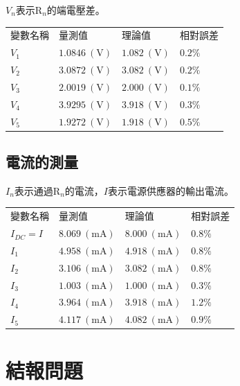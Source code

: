 \documentclass[12pt, a4paper]{article}
\newcommand{\unit}[1]{\:(\text{#1})}
\begin{document}
$V_n$表示$\text{R}_n$的端電壓差。

\begin{center}
	\begin{tabular}{p{2.5cm}p{4cm}p{4cm}p{3cm}}
	\hline
	變數名稱 & 量測值 & 理論值 & 相對誤差 \\
	\hhline{====}
	$V_{1}$ & $1.0846 \unit{V}$ & $1.082 \unit{V}$ & $0.2\%$ \\
	\hline
	$V_{2}$ & $3.0872 \unit{V}$ & $3.082 \unit{V}$ & $0.2\%$ \\
	\hline
	$V_{3}$ & $2.0019 \unit{V}$ & $2.000 \unit{V}$ & $0.1\%$ \\
	\hline
	$V_{4}$ & $3.9295 \unit{V}$ & $3.918 \unit{V}$ & $0.3\%$ \\
	\hline
	$V_{5}$ & $1.9272 \unit{V}$ & $1.918 \unit{V}$ & $0.5\%$ \\
	\hline
\end{tabular}
\end{center}

\subsection{電流的測量}

$I_n$表示通過$\text{R}_n$的電流，$I$表示電源供應器的輸出電流。

\begin{center}
	\begin{tabular}{p{2.5cm}p{4cm}p{4cm}p{3cm}}
	\hline
	變數名稱 & 量測值 & 理論值 & 相對誤差 \\
	\hhline{====}
	$I_{DC} = I$ & $8.069 \unit{mA}$ & $8.000 \unit{mA}$ & $0.8\%$ \\
	\hline
	$I_{1}$ & $4.958 \unit{mA}$ & $4.918 \unit{mA}$ & $0.8\%$ \\
	\hline
	$I_{2}$ & $3.106 \unit{mA}$ & $3.082 \unit{mA}$ & $0.8\%$ \\
	\hline
	$I_{3}$ & $1.003 \unit{mA}$ & $1.000 \unit{mA}$ & $0.3\%$ \\
	\hline
	$I_{4}$ & $3.964 \unit{mA}$ & $3.918 \unit{mA}$ & $1.2\%$ \\
	\hline
	$I_{5}$ & $4.117 \unit{mA}$ & $4.082 \unit{mA}$ & $0.9\%$ \\
	\hline
\end{tabular}
\end{center}

\section{結報問題}
\end{document}
